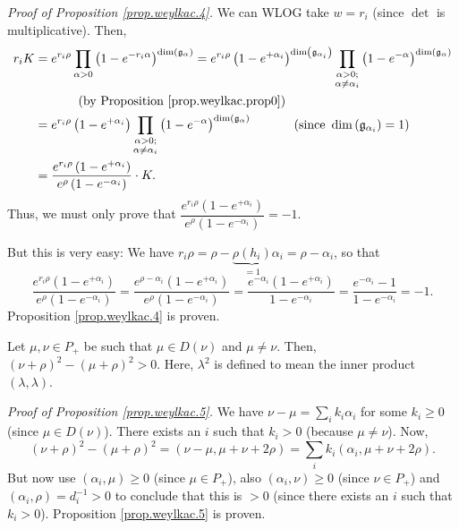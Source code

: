 \documentclass[etingof-lie.tex]{subfiles}
\begin{document}
\textit{Proof of Proposition \ref{prop.weylkac.4}.} We can WLOG take $w=r_{i}$
(since $\det$ is multiplicative). Then,%
\begin{align*}
r_{i}K  &  =e^{r_{i}\rho}\prod\limits_{\alpha>0}\left(  1-e^{-r_{i}\alpha
}\right)  ^{\dim\left(  \mathfrak{g}_{\alpha}\right)  }=e^{r_{i}\rho}\left(
1-e^{+\alpha_{i}}\right)  ^{\dim\left(  \mathfrak{g}_{\alpha_{i}}\right)
}\prod\limits_{\substack{\alpha>0;\\\alpha\neq\alpha_{i}}}\left(
1-e^{-\alpha}\right)  ^{\dim\left(  \mathfrak{g}_{\alpha}\right)  }\\
&  \ \ \ \ \ \ \ \ \ \ \left(  \text{by Proposition \ref{prop.weylkac.prop0}%
}\right) \\
&  =e^{r_{i}\rho}\left(  1-e^{+\alpha_{i}}\right)  \prod
\limits_{\substack{\alpha>0;\\\alpha\neq\alpha_{i}}}\left(  1-e^{-\alpha
}\right)  ^{\dim\left(  \mathfrak{g}_{\alpha}\right)  }%
\ \ \ \ \ \ \ \ \ \ \left(  \text{since }\dim\left(  \mathfrak{g}_{\alpha_{i}%
}\right)  =1\right) \\
&  =\dfrac{e^{r_{i}\rho}\left(  1-e^{+\alpha_{i}}\right)  }{e^{\rho}\left(
1-e^{-\alpha_{i}}\right)  }\cdot K.
\end{align*}
Thus, we must only prove that $\dfrac{e^{r_{i}\rho}\left(  1-e^{+\alpha_{i}%
}\right)  }{e^{\rho}\left(  1-e^{-\alpha_{i}}\right)  }=-1$.

But this is very easy: We have $r_{i}\rho=\rho-\underbrace{\rho\left(
h_{i}\right)  }_{=1}\alpha_{i}=\rho-\alpha_{i}$, so that
\[
\dfrac{e^{r_{i}\rho}\left(  1-e^{+\alpha_{i}}\right)  }{e^{\rho}\left(
1-e^{-\alpha_{i}}\right)  }=\dfrac{e^{\rho-\alpha_{i}}\left(  1-e^{+\alpha
_{i}}\right)  }{e^{\rho}\left(  1-e^{-\alpha_{i}}\right)  }=\dfrac
{e^{-\alpha_{i}}\left(  1-e^{+\alpha_{i}}\right)  }{1-e^{-\alpha_{i}}}%
=\dfrac{e^{-\alpha_{i}}-1}{1-e^{-\alpha_{i}}}=-1.
\]
Proposition \ref{prop.weylkac.4} is proven.

\begin{proposition}
\label{prop.weylkac.5}Let $\mu,\nu\in P_{+}$ be such that $\mu\in D\left(
\nu\right)  $ and $\mu\neq\nu$. Then, $\left(  \nu+\rho\right)  ^{2}-\left(
\mu+\rho\right)  ^{2}>0$. Here, $\lambda^{2}$ is defined to mean the inner
product $\left(  \lambda,\lambda\right)  $.
\end{proposition}

\textit{Proof of Proposition \ref{prop.weylkac.5}.} We have $\nu-\mu
=\sum\limits_{i}k_{i}\alpha_{i}$ for some $k_{i}\geq0$ (since $\mu\in D\left(
\nu\right)  $). There exists an $i$ such that $k_{i}>0$ (because $\mu\neq\nu
$). Now,%
\[
\left(  \nu+\rho\right)  ^{2}-\left(  \mu+\rho\right)  ^{2}=\left(  \nu
-\mu,\mu+\nu+2\rho\right)  =\sum\limits_{i}k_{i}\left(  \alpha_{i},\mu
+\nu+2\rho\right)  .
\]
But now use $\left(  \alpha_{i},\mu\right)  \geq0$ (since $\mu\in P_{+}$),
also $\left(  \alpha_{i},\nu\right)  \geq0$ (since $\nu\in P_{+}$) and
$\left(  \alpha_{i},\rho\right)  =d_{i}^{-1}>0$ to conclude that this is $>0$
(since there exists an $i$ such that $k_{i}>0$). Proposition
\ref{prop.weylkac.5} is proven.
\end{document}

